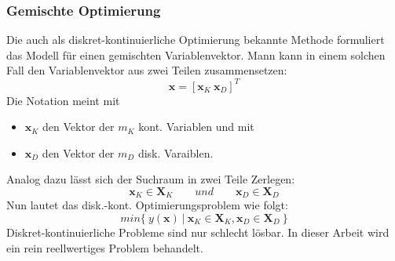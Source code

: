 \subsubsection{Gemischte Optimierung}
%
Die auch als diskret-kontinuierliche Optimierung bekannte Methode formuliert das Modell für einen gemischten Variablenvektor. Mann kann in einem solchen Fall den Variablenvektor aus zwei Teilen zusammensetzen:
$$
\mathbf{x} = [\mathbf{x}_K~\mathbf{x}_D]^T
$$
Die Notation meint mit
\begin{itemize}
\item $\mathbf{x}_K$ den Vektor der $m_K$ kont. Variablen und mit
\item $\mathbf{x}_D$ den Vektor der $m_D$ disk. Varaiblen.
\end{itemize}
%
Analog dazu lässt sich der Suchraum in zwei Teile Zerlegen:
$$
\mathbf{x}_K\in\mathbf{X}_K \qquad und \qquad \mathbf{x}_D\in\mathbf{X}_D
$$
Nun lautet das disk.-kont. Optimierungsproblem wie folgt:
%
\begin{equation}
	min\{~y(\mathbf{x})~|~\mathbf{x}_K\in\mathbf{X}_K,\mathbf{x}_D\in\mathbf{X}_D~\}
\end{equation}
%
Diskret-kontinuierliche Probleme sind nur schlecht lösbar. In dieser Arbeit wird ein rein reellwertiges Problem behandelt.
%
